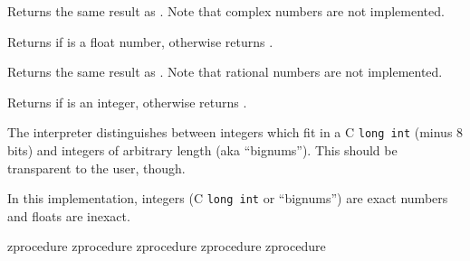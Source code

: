 \begin{entry}{%
}
\saut
Returns the same result as .  Note that complex numbers
are not implemented.
\end{entry}

\begin{entry}{%
}
\saut
Returns {\schtrue} if  is a float number, otherwise returns
{\schfalse}.
\end{entry}

\begin{entry}{%
}
\saut
Returns the same result as . Note that rational numbers are not
implemented.
\end{entry}

\begin{entry}{%
}
\saut
Returns {\schtrue} if  is an integer, otherwise returns {\schfalse}.
\begin{note}
  The {\stk} interpreter distinguishes between integers which fit in a
  C {\tt long int} (minus 8 bits) and integers of arbitrary length
  (aka ``bignums''). This should be transparent to the user, though.
\end{note}
\end{entry}

\begin{entry}{%
}
\saut
In this implementation, integers (C {\tt long int} or ``bignums'') are exact
numbers and floats are inexact.
\end{entry}

\begin{entry}{%
 { z}{procedure}
 { z}{procedure}
 { z}{procedure}
 { z}{procedure}
 { z}{procedure}
}
\saut
\doc
\end{entry}

